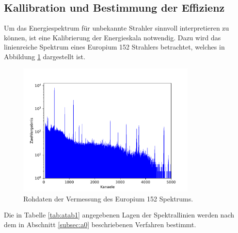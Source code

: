 \subsection{Kallibration und Bestimmung der Effizienz}
\label{subsec:a1}
Um das Energiespektrum für unbekannte Strahler sinnvoll interpretieren zu können,
ist eine Kalibrierung der Energieskala notwendig. Dazu wird das linienreiche Spektrum eines Europium 152 Strahlers betrachtet, welches in Abbildung \ref{fig:spektrum_eu} dargestellt ist.
\begin{figure}
 \centering
 \includegraphics[width=0.8\textwidth]{python/plots/spec1.pdf}
 \caption{Rohdaten der Vermessung des Europium 152 Spektrums.}
 \label{fig:spektrum_eu}
 \end{figure} 
Die in Tabelle \ref{tab:atab1} angegebenen Lagen der Spektrallinien werden nach dem in Abschnitt \ref{subsec:a0} beschriebenen Verfahren bestimmt.
